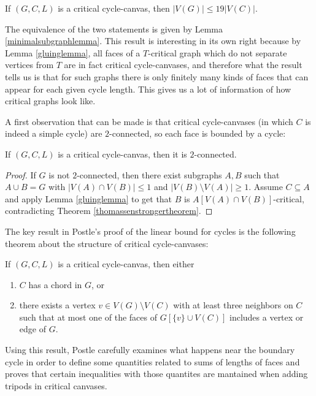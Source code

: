 \begin{theorem}
If $(G, C, L)$ is a critical cycle-canvas, then $|V(G)| \leq 19 |V(C)|$.
\end{theorem}

The equivalence of the two statements is given by Lemma \ref{minimalsubgraphlemma}. This result is interesting in its own right because by Lemma \ref{gluinglemma}, all faces of a $T$-critical graph which do not separate vertices from $T$ are in fact critical cycle-canvases, and therefore what the result tells us is that for such graphs there is only finitely many kinds of faces that can appear for each given cycle length. This gives us a lot of information of how critical graphs look like. 

A first observation that can be made is that critical cycle-canvases (in which $C$ is indeed a simple cycle) are $2$-connected, so each face is bounded by a cycle:

\begin{lemma}
If $(G, C, L)$ is a critical cycle-canvas, then it is $2$-connected.
\end{lemma}

\begin{proof}
If $G$ is not $2$-connected, then there exist subgraphs $A, B$ such that $A \cup B = G$ with $|V(A) \cap V(B)| \leq 1$ and $|V(B) \setminus V(A)| \geq 1$. Assume $C \subseteq A$ and apply Lemma \ref{gluinglemma} to get that $B$ is $A[V(A) \cap V(B)]$-critical, contradicting Theorem \ref{thomassenstrongertheorem}.
\end{proof}

The key result in Postle's proof of the linear bound for cycles is the following theorem about the structure of critical cycle-canvases:

\begin{theorem}
\label{cyclechordtripodtheorem}
If $(G, C, L)$ is a critical cycle-canvas, then either

\begin{enumerate}
\item $C$ has a chord in $G$, or
\item there exists a vertex $v \in V(G) \setminus V(C)$ with at least three neighbors on $C$ such that at most one of the faces of $G[\{v\} \cup V(C)]$ includes a vertex or edge of $G$. 
\end{enumerate}
\end{theorem}

Using this result, Postle carefully examines what happens near the boundary cycle in order to define some quantities related to sums of lengths of faces and proves that certain inequalities with those quantites are mantained when adding tripods in critical canvases. 



